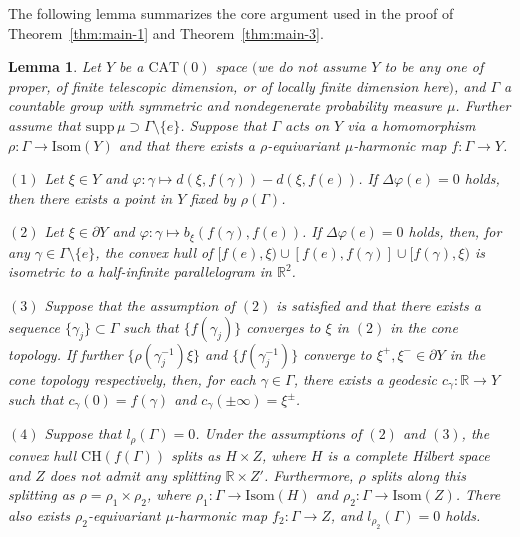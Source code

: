 \documentclass[12pt]{amsart}
\numberwithin{equation}{section}
\theoremstyle{plain}
\newtheorem{Lemma}[Theorem]{Lemma}
\theoremstyle{definition}
\theoremstyle{remark}
\newcommand{\R}{{\mathbb R}}
\newcommand{\isom}[1]{\mathrm{Isom}({#1})}
\newcommand{\cat}[1]{\mathrm{CAT}(#1)}
\newcommand{\ray}[1]{[#1)}
\newcommand{\ch}[1]{\mathrm{CH}(#1)}
\newcommand{\supp}{\mathrm{supp}\,}
\begin{document}
The following lemma summarizes the core argument used in the
proof of Theorem~\ref{thm:main-1} and Theorem~\ref{thm:main-3}.

\begin{Lemma}
 \label{lem:core}
 Let $Y$ be a $\cat{0}$ space $($we do not assume $Y$ to be any one of  proper,
 of finite telescopic dimension, or of locally finite dimension here$)$,  
 and $\Gamma$ a countable group with
 symmetric and nondegenerate probability measure $\mu$. 
 Further assume that $\supp \mu \supset \Gamma \setminus \{e\}$. 
 Suppose that $\Gamma$ acts on $Y$ via a homomorphism 
 $\rho\colon \Gamma \rightarrow \isom{Y}$ and that there exists a
 $\rho$-equivariant $\mu$-harmonic map $f\colon \Gamma \rightarrow Y$.

 $(1)$ Let $\xi \in Y$ and  
 $\varphi\colon \gamma \mapsto d(\xi,f(\gamma))-d(\xi,f(e))$. 
 If $\Delta \varphi(e)=0$ holds, then there exists a point in $Y$ fixed
 by $\rho(\Gamma)$.

 $(2)$ Let $\xi \in \partial Y$ and 
 $\varphi\colon \gamma \mapsto b_{\xi}(f(\gamma),f(e))$. 
 If $\Delta \varphi(e)=0$ holds, then, for any
 $\gamma \in \Gamma\setminus \{e\}$, the convex hull of 
 $\ray{f(e),\xi}\cup [f(e),f(\gamma)]\cup \ray{f(\gamma),\xi}$
 is isometric to a half-infinite parallelogram in $\R^2$. 

 $(3)$ Suppose that the assumption of $(2)$ is satisfied and that there
 exists a sequence $\{\gamma_j\}\subset \Gamma$ such that 
 $\{f(\gamma_j)\}$ converges to $\xi$ in $(2)$ in the cone topology. 
 If further $\{\rho(\gamma_j^{-1})\xi\}$ and $\{f(\gamma_j^{-1})\}$
 converge to $\xi^+, \xi^{-}\in \partial Y$ in the cone topology
 respectively, 
 then, for each $\gamma \in \Gamma$, there exists a geodesic 
 $c_{\gamma}\colon \R \rightarrow Y$ such that $c_{\gamma}(0)=f(\gamma)$
 and $c_{\gamma}(\pm \infty)=\xi^{\pm}$.

 $(4)$ Suppose that 
 $l_{\rho}(\Gamma)=0$. 
 Under the assumptions of $(2)$ and $(3)$, 
 the convex hull $\ch{f(\Gamma)}$ splits as $H\times Z$, where
 $H$ is a complete Hilbert space and $Z$ does not admit any splitting
 $\R \times Z'$.  
 Furthermore, $\rho$ splits along this splitting
 as $\rho=\rho_1 \times \rho_2$, where 
 $\rho_1 \colon \Gamma \rightarrow \isom{H}$ and 
 $\rho_2 \colon \Gamma \rightarrow \isom{Z}$. 
 There also exists $\rho_2$-equivariant $\mu$-harmonic map 
 $f_2\colon \Gamma \rightarrow Z$, and $l_{\rho_2}(\Gamma)=0$
 holds.
\end{Lemma}
\end{document}
